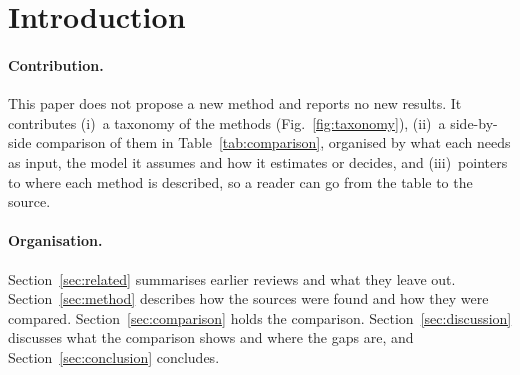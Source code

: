 \section{Introduction}
\label{sec:intro}





\paragraph{Contribution.}
This paper does not propose a new method and reports no new results. It contributes
(i)~a taxonomy of the methods (Fig.~\ref{fig:taxonomy}), (ii)~a side-by-side comparison of them
in Table~\ref{tab:comparison}, organised by what each needs as input, the model it assumes and
how it estimates or decides, and (iii)~pointers to where each method is described, so a reader
can go from the table to the source.

\paragraph{Organisation.}
Section~\ref{sec:related} summarises earlier reviews and what they leave out.
Section~\ref{sec:method} describes how the sources were found and how they were compared.
Section~\ref{sec:comparison} holds the comparison. Section~\ref{sec:discussion} discusses what
the comparison shows and where the gaps are, and Section~\ref{sec:conclusion} concludes.

